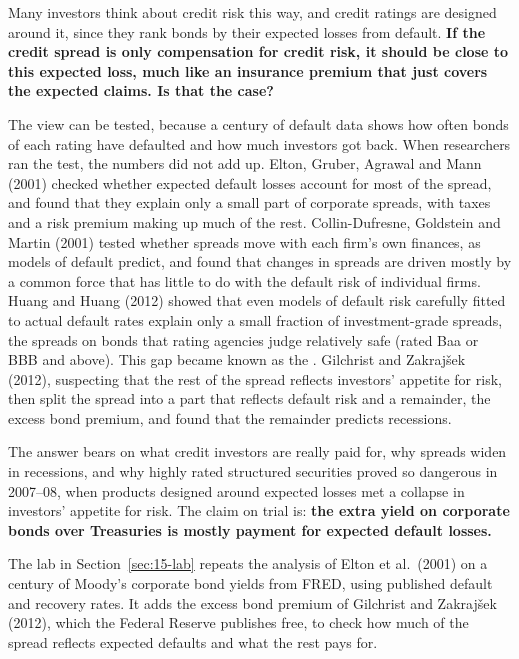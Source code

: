 Many investors think about credit risk this way, and credit ratings are designed around it, since they rank bonds by their expected losses from default.
\textbf{If the credit spread is only compensation for credit risk, it should be close to this expected loss, much like an insurance premium that just covers the expected claims. Is that the case?}


The view can be tested, because a century of default data shows how often bonds of each rating have defaulted and how much investors got back. When researchers ran the test, the numbers did not add up. Elton, Gruber, Agrawal and Mann (2001) checked whether expected default losses account for most of the spread, and found that they explain only a small part of corporate spreads, with taxes and a risk premium making up much of the rest. Collin-Dufresne, Goldstein and Martin (2001) tested whether spreads move with each firm's own finances, as models of default predict, and found that changes in spreads are driven mostly by a common force that has little to do with the default risk of individual firms. Huang and Huang (2012) showed that even models of default risk carefully fitted to actual default rates explain only a small fraction of investment-grade spreads, the spreads on bonds that rating agencies judge relatively safe (rated Baa or BBB and above). This gap became known as the . Gilchrist and Zakraj\v{s}ek (2012), suspecting that the rest of the spread reflects investors' appetite for risk, then split the spread into a part that reflects default risk and a remainder, the excess bond premium, and found that the remainder predicts recessions.

The answer bears on what credit investors are really paid for, why spreads widen in recessions, and why highly rated structured securities proved so dangerous in 2007--08, when products designed around expected losses met a collapse in investors' appetite for risk. The claim on trial is: \textbf{the extra yield on corporate bonds over Treasuries is mostly payment for expected default losses.}

The lab in Section~\ref{sec:15-lab} repeats the analysis of Elton et al.\ (2001) on a century of Moody's corporate bond yields from FRED, using published default and recovery rates. It adds the excess bond premium of Gilchrist and Zakraj\v{s}ek (2012), which the Federal Reserve publishes free, to check how much of the spread reflects expected defaults and what the rest pays for.

